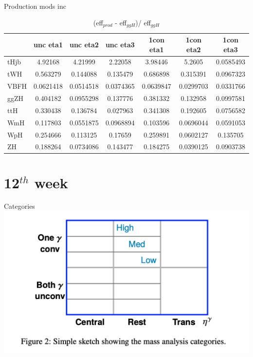\documentclass[10pt,UKenglish, leqno, xcolor = dvipsnames]{beamer}
\begin{document}
		\begin{frame}{Production mods inc}
			\vfill
			\centering
			\begin{table}[tbp]
				\centering
				\small
				\begin{tabular}{lcccccc}
					\toprule[1.5pt]
							& unc eta1	& unc eta2	& unc eta3	& 1con eta1	& 1con eta2	& 1con eta3 \\
					\midrule
					tHjb 	& 4.92168	& 4.21999	& 2.22058	& 3.98446	& 5.2605	& 0.0585493	\\
					tWH 	& 0.563279	& 0.144088	& 0.135479	& 0.686898	& 0.315391	& 0.0967323	\\
					VBFH 	& 0.0621418	& 0.0514518	& 0.0374365	& 0.0639847	& 0.0299703	& 0.0331766	\\
					ggZH 	& 0.404182	& 0.0955298	& 0.137776	& 0.381332	& 0.132958	& 0.0997581	\\
					ttH 	& 0.330438	& 0.136784	& 0.027963	& 0.341308	& 0.192605	& 0.0756582	\\
					WmH 	& 0.117803	& 0.0551875	& 0.0968894	& 0.103596	& 0.0696044	& 0.0591053	\\
					WpH 	& 0.254666	& 0.113125	& 0.17659	& 0.259891	& 0.0602127	& 0.135705	\\
					ZH 		& 0.188264	& 0.0734086	& 0.143477	& 0.184275	& 0.0390125	& 0.0903738	\\
					\bottomrule[1.5pt]
				\end{tabular}
				\caption{(eff$_{prod}$ - eff$_{ggH}$)/ eff$_{ggH}$}
			\end{table}
			\vfill
		\end{frame}
	
	\section{12$^{th}$ week}
	\SectionPage
	
		\begin{frame}{Categories}
			\vfill
			\includegraphics[width=1.\textwidth]{../images/week_9/category.png}
			\vfill
		\end{frame}
	
\end{document}
